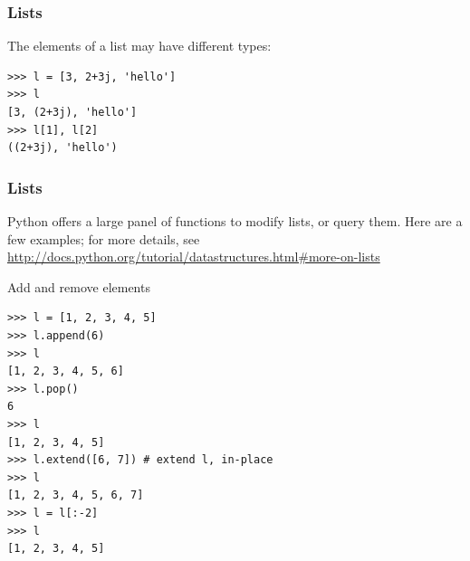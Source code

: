 \documentclass[colorlinks]{beamer}
\begin{document}
\begin{frame}[fragile]\frametitle{Lists}
\begin{block}{The elements of a list may have different types:}
\begin{verbatim}
>>> l = [3, 2+3j, 'hello']
>>> l
[3, (2+3j), 'hello']
>>> l[1], l[2]
((2+3j), 'hello')
\end{verbatim}

\end{block}

\end{frame}
\begin{frame}[fragile]\frametitle{Lists}
\vspace{-0.2cm}
\small
Python offers a large panel of functions to modify lists, or query them. Here are a few examples; for more details, see \href{http://docs.python.org/tutorial/datastructures.html#more-on-lists}{http://docs.python.org/tutorial/datastructures.html\#more-on-lists}
\vspace{-0.2cm}
\begin{block}{Add and remove elements}
\tiny
\begin{verbatim}
>>> l = [1, 2, 3, 4, 5]
>>> l.append(6)
>>> l
[1, 2, 3, 4, 5, 6]
>>> l.pop()
6
>>> l
[1, 2, 3, 4, 5]
>>> l.extend([6, 7]) # extend l, in-place
>>> l
[1, 2, 3, 4, 5, 6, 7]
>>> l = l[:-2]
>>> l
[1, 2, 3, 4, 5]
\end{verbatim}

\end{block}
\end{frame}
\end{document}
